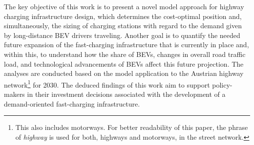 \documentclass[journal,article,submit,pdftex,moreauthors]{Definitions/mdpi}
\begin{document}
The key objective of this work is to present a novel model approach for highway charging infrastructure design, which determines the cost-optimal position and, simultaneously, the sizing of charging stations with regard to the demand given by long-distance BEV drivers traveling. Another goal is to quantify the needed future expansion of the fast-charging infrastructure that is currently in place and, within this, to understand how the share of BEVs, changes in overall road traffic load, and technological advancements of BEVs affect this future projection. The analyses are conducted based on the model application to the Austrian highway network\footnote{This also includes motorways. For better readability of this paper, the phrase of \textit{highway} is used for both, highways and motorways, in the street network.} for 2030. The deduced findings of this work aim to support policy-makers in their investment decisions associated with the development of a demand-oriented fast-charging infrastructure.
\end{document}
